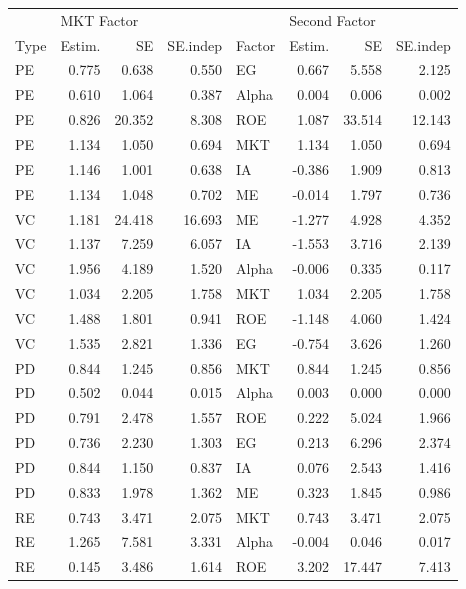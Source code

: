 \documentclass[12pt]{article}
\begin{document}
\begin{table}[ht]
	\centering
	\begin{tabular}{lrrrlrrr}
		 & \multicolumn{3}{l}{MKT Factor} & & \multicolumn{3}{l}{Second Factor} \\ 
		Type & Estim. & SE & SE.indep & Factor & Estim. & SE & SE.indep \\ 
		\hline
		\hline
PE & 0.775 & 0.638 & 0.550 & EG & 0.667 & 5.558 & 2.125 \\ 
PE & 0.610 & 1.064 & 0.387 & Alpha & 0.004 & 0.006 & 0.002 \\ 
PE & 0.826 & 20.352 & 8.308 & ROE & 1.087 & 33.514 & 12.143 \\ 
PE & 1.134 & 1.050 & 0.694 & MKT & 1.134 & 1.050 & 0.694 \\ 
PE & 1.146 & 1.001 & 0.638 & IA & -0.386 & 1.909 & 0.813 \\ 
PE & 1.134 & 1.048 & 0.702 & ME & -0.014 & 1.797 & 0.736 \\ 
\hline
VC & 1.181 & 24.418 & 16.693 & ME & -1.277 & 4.928 & 4.352 \\ 
VC & 1.137 & 7.259 & 6.057 & IA & -1.553 & 3.716 & 2.139 \\ 
VC & 1.956 & 4.189 & 1.520 & Alpha & -0.006 & 0.335 & 0.117 \\ 
VC & 1.034 & 2.205 & 1.758 & MKT & 1.034 & 2.205 & 1.758 \\ 
VC & 1.488 & 1.801 & 0.941 & ROE & -1.148 & 4.060 & 1.424 \\ 
VC & 1.535 & 2.821 & 1.336 & EG & -0.754 & 3.626 & 1.260 \\ 
\hline
PD & 0.844 & 1.245 & 0.856 & MKT & 0.844 & 1.245 & 0.856 \\ 
PD & 0.502 & 0.044 & 0.015 & Alpha & 0.003 & 0.000 & 0.000 \\ 
PD & 0.791 & 2.478 & 1.557 & ROE & 0.222 & 5.024 & 1.966 \\ 
PD & 0.736 & 2.230 & 1.303 & EG & 0.213 & 6.296 & 2.374 \\ 
PD & 0.844 & 1.150 & 0.837 & IA & 0.076 & 2.543 & 1.416 \\ 
PD & 0.833 & 1.978 & 1.362 & ME & 0.323 & 1.845 & 0.986 \\ 
\hline
RE & 0.743 & 3.471 & 2.075 & MKT & 0.743 & 3.471 & 2.075 \\ 
RE & 1.265 & 7.581 & 3.331 & Alpha & -0.004 & 0.046 & 0.017 \\ 
RE & 0.145 & 3.486 & 1.614 & ROE & 3.202 & 17.447 & 7.413 \\ 

\end{tabular}
\end{table}
\end{document}
